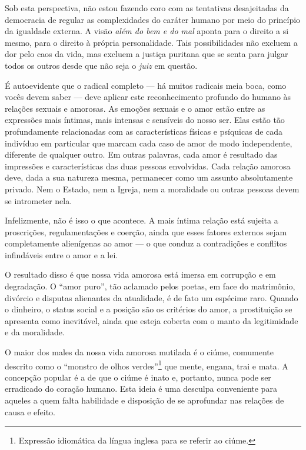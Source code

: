 Sob esta perspectiva, não estou fazendo coro com as tentativas desajeitadas da
democracia de regular as complexidades do caráter humano por meio do
princípio da igualdade externa. A visão \textit{além do bem e do mal} aponta
para o direito a si mesmo, para o direito à própria personalidade. Tais
possibilidades não excluem a dor pelo caos da vida, mas excluem a
justiça puritana que se senta para julgar todos os outros desde que não
seja o \textit{juiz} em questão.

É autoevidente que o radical completo --- há muitos radicais meia boca,
como vocês devem saber --- deve aplicar este reconhecimento profundo do
humano às relações sexuais e amorosas. As emoções sexuais e o amor estão
entre as expressões mais íntimas, mais intensas e sensíveis do nosso
ser. Elas estão tão profundamente relacionadas com as características
físicas e psíquicas de cada indivíduo em particular que marcam cada caso
de amor de modo independente, diferente de qualquer outro. Em outras
palavras, cada amor é resultado das impressões e características das
duas pessoas envolvidas. Cada relação amorosa deve, dada a sua natureza
mesma, permanecer como um assunto absolutamente privado. Nem o Estado,
nem a Igreja, nem a moralidade ou outras pessoas devem se intrometer nela.

Infelizmente, não é isso o que acontece. A mais íntima relação está
sujeita a proscrições, regulamentações e coerção, ainda que esses
fatores externos sejam completamente alienígenas ao amor --- o que conduz
a contradições e conflitos infindáveis entre o amor e a lei.

O resultado disso é que nossa vida amorosa está imersa em corrupção e em
degradação. O ``amor puro'', tão aclamado pelos poetas, em face do
matrimônio, divórcio e disputas alienantes da atualidade, é de fato um
espécime raro. Quando o dinheiro, o status social e a posição são os
critérios do amor, a prostituição se apresenta como inevitável, ainda
que esteja coberta com o manto da legitimidade e da moralidade.

O maior dos males da nossa vida amorosa mutilada é o ciúme, comumente
descrito como o ``monstro de olhos verdes''\footnote{Expressão
  idiomática da língua inglesa para se referir ao ciúme.} que mente,
engana, trai e mata. A concepção popular é a de que o ciúme é inato e,
portanto, nunca pode ser erradicado do coração humano. Esta ideia é uma
desculpa conveniente para aqueles a quem falta habilidade e disposição
de se aprofundar nas relações de causa e efeito.

